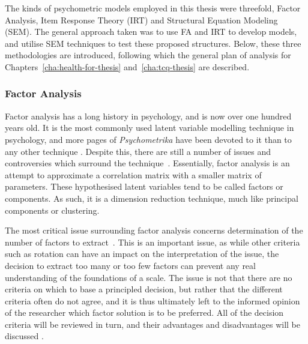 The kinds of psychometric models employed in this thesis were threefold, Factor Analysis, Item Response Theory (IRT) and Structural Equation Modeling (SEM). The general approach taken was to use FA and IRT to develop models, and utilise SEM techniques to test these proposed structures. Below, these three methodologies are introduced, following which the general plan of analysis for Chapters~\ref{cha:health-for-thesis} and~\ref{cha:tcq-thesis} are described. 

\subsubsection{Factor Analysis}
\label{sec:factor-analysis}
Factor analysis has a long history in psychology, and is now over one hundred years old. It is the most commonly used latent variable modelling technique in psychology, and more pages of \textit{Psychometrika} have been devoted to it than to any other technique \cite{henson2006use}.  Despite this, there are still a number of issues and controversies which surround the technique~\cite{sass2010comparative}.  Essentially, factor analysis is an attempt to approximate a correlation matrix with a smaller matrix of parameters.  These hypothesised latent variables tend to be called factors or components. As such, it is a dimension reduction technique, much like principal components or clustering. 



The most critical issue surrounding factor analysis concerns determination of the number of factors to extract~\cite{zwick1986comparison}.  This is an important issue, as while other criteria such as rotation can have an impact on the interpretation of the issue, the decision to extract too many or too few factors can prevent any real understanding of the foundations of a scale.   The issue is not that there are no criteria on which to base a principled decision, but rather that the different criteria often do not agree, and it is thus ultimately left to the informed opinion of the researcher which factor solution is to be preferred.  All of the decision criteria will be reviewed in turn, and their advantages and disadvantages will be discussed \cite{henson2006use}. 

